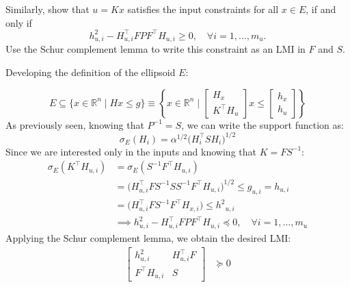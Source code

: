 \documentclass[]{article}
\begin{document}
\begin{assignment}\label{sess3:c3}
	Similarly, show that $u = Kx$ satisfies the input constraints for all $x \in E$, 
	if and only if 
	\[ 
		h_{u,i}^2 - H_{u,i}^\top F P F^\top H_{u,i} \geq 0, \quad \forall i = 1, \dots, m_{u}.
	\]
	Use the Schur complement lemma to write this constraint as an LMI in $F$ and $S$.
\end{assignment}
\begin{flushleft}
	Developing the definition of the ellipsoid $E$:
\end{flushleft}
\[ 
    E \subseteq \{x \in \mathbb{R}^n \mid Hx \leq g \} \equiv 
    \left\{ x \in \mathbb{R}^n \mid 
    \begin{bmatrix}
        H_x \\
        K^\top H_u
    \end{bmatrix} x \leq 
    \begin{bmatrix}
        h_x \\
        h_u
    \end{bmatrix} 
    \right\}
\]
As previously seen, knowing that $ P^{-1} = S $, we can write the support function as:
\begin{equation}
	\sigma_E(H_i) = \alpha^{1/2} \Big( H_i^\top S H_i \Big)^{1/2}
\end{equation}
Since we are interested only in the inputs and knowing that $ K = F S^{-1} $:
\begin{equation}
	\begin{aligned}
		\sigma_E(K^\top H_{u,i}) &= \sigma_E(S^{-1} F^\top H_{u,i}) \\
								 &= \Big( H_{u,i}^\top F S^{-1} S S^{-1} F^\top H_{u,i} \Big)^{1/2} \leq g_{u,i} = h_{u,i} \\
								 &= \Big( H_{u,i}^\top F S^{-1} F^\top H_{x,i} \Big) \leq {h^2}_{u,i} \\
								 &\implies h_{u,i}^2 - H_{u,i}^\top F P F^\top H_{u,i} \preceq 0, \quad \forall i = 1, \dots, m_{u}
	\end{aligned}
\end{equation}
Applying the Schur complement lemma, we obtain the desired LMI:
\begin{equation}
	\begin{aligned}
		\begin{bmatrix}
			h_{u,i}^2 & H_{u,i}^\top F \\ 
			F^\top H_{u,i} & S
		\end{bmatrix} &\succeq 0
	\end{aligned}
\end{equation}
\end{document}
